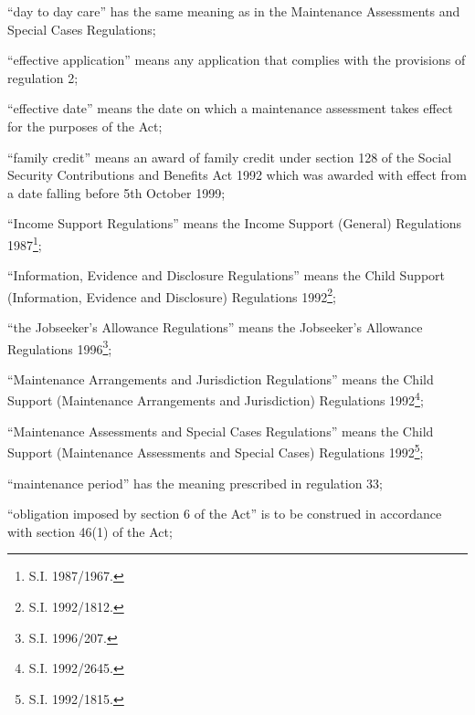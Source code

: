 \documentclass[a4paper,12pt]{article}
\begin{document}
\begin{enumerate}
“day to day care” has the same meaning as in the Maintenance Assessments and Special Cases Regulations;

“effective application” means any application that complies with the provisions of regulation 2;

“effective date” means the date on which a maintenance assessment takes effect for the purposes of the Act;

“family credit” means an award of family credit under section 128 of the Social Security Contributions and Benefits Act 1992 which was awarded with effect from a date falling before 5th October 1999;

“Income Support Regulations” means the Income Support (General) Regulations 1987\footnote{\frenchspacing S.I. 1987/1967.};

“Information, Evidence and Disclosure Regulations” means the Child Support (Information, Evidence and Disclosure) Regulations 1992\footnote{\frenchspacing S.I. 1992/1812.};

\begin{sloppypar}
“the Jobseeker’s Allowance Regulations” means the Jobseeker’s Allowance Regulations 1996\footnote{\frenchspacing S.I. 1996/207.};
\end{sloppypar}

“Maintenance Arrangements and Jurisdiction Regulations” means the Child Support (Maintenance Arrangements and Jurisdiction) Regulations 1992\footnote{\frenchspacing S.I. 1992/2645.};

“Maintenance Assessments and Special Cases Regulations” means the Child Support (Maintenance Assessments and Special Cases) Regulations 1992\footnote{\frenchspacing S.I. 1992/1815.};

“maintenance period” has the meaning prescribed in regulation 33;

“obligation imposed by section 6 of the Act” is to be construed in accordance with section 46(1) of the Act;



\end{enumerate}
\end{document}
